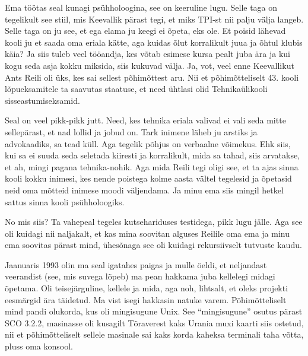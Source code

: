
Ema töötas seal kunagi psühholoogina, see on keeruline lugu. Selle taga on 
tegelikult see stiil, mis  Keevallik pärast tegi, et miks TPI-st nii palju välja 
langeb. Selle taga on ju see, et ega elama ju keegi ei õpeta, eks ole. Et 
poisid lähevad  kooli ju et saada oma eriala kätte, aga kuidas õlut korralikult 
juua ja õhtul klubis käia? Ja siis tuleb  veel tööandja, kes võtab esimese 
kursa pealt juba ära ja kui kogu seda asja kokku miksida, siis kukuvad välja. 
Ja, vot, veel enne Keevallikut Ants Reili oli üks, kes 
sai sellest põhimõttest aru. Nii et põhimõtteliselt 43. kooli lõpueksamitele ta saavutas staatuse, et need ühtlasi olid 
Tehnikaülikooli sisseastumiseksamid. 

Seal on veel pikk-pikk jutt. Need, kes tehnika eriala valivad ei vali seda 
mitte sellepärast, et nad lollid ja jobud on. Tark inimene läheb ju arstiks ja 
advokaadiks, sa tead küll. Aga tegelik põhjus on verbaalne võimekus. Ehk siis, 
kui sa ei suuda seda seletada kiiresti ja korralikult, mida sa tahad, siis 
arvatakse, et ah, mingi pagana tehnika-nohik. Aga mida Reili tegi oligi see, et 
ta ajas sinna kooli kokku inimesi, kes nende poistega kolme aasta vältel 
tegelesid ja õpetasid neid oma mõtteid inimese moodi väljendama. Ja minu ema 
siis mingil hetkel sattus sinna kooli psühholoogiks. 


No mis siis? Ta vahepeal tegeles kutsehariduses testidega, pikk lugu jälle. Aga 
see oli kuidagi nii naljakalt, et kas mina soovitan alguses 
Reilile oma ema ja minu ema soovitas pärast mind, 
ühesõnaga see oli kuidagi rekursiivselt tutvuste kaudu. 

Jaanuaris 1993 olin ma seal igatahes paigas ja mulle öeldi, et neljandast 
veerandist (see, mis suvega lõpeb) ma pean hakkama juba kellelegi midagi 
õpetama. Oli teisejärguline, kellele ja mida, aga noh, lihtsalt, et oleks 
projekti eesmärgid ära täidetud. Ma vist isegi hakkasin natuke varem. 
Põhimõtteliselt mind pandi olukorda, kus oli mingisugune Unix. See 
\enquote{mingisugune} osutus pärast SCO 3.2.2, masinasse oli 
kusagilt Tõraverest kaks Urania muxi kaarti siis ostetud, nii et 
põhimõtteliselt sellele masinale sai kaks korda kaheksa terminali taha võtta, 
pluss oma konsool.  

